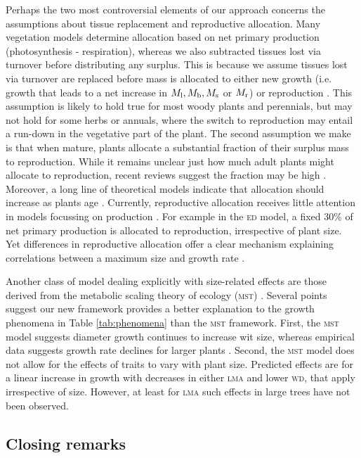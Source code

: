 \documentclass[9pt,twocolumn,twoside,lineno]{pnas-new}
\newcommand{\lma}{\textsc{lma}}
\newcommand{\wood}{\textsc{wd}}
\begin{document}
Perhaps the two most controversial elements of our approach concerns the assumptions about tissue replacement and reproductive allocation. Many vegetation models determine allocation based on net primary production (photosynthesis - respiration), whereas we also subtracted tissues lost via turnover before distributing any surplus. This is because we assume tissues lost via turnover are replaced before mass is allocated to either new growth (i.e. growth that leads to a net increase in $M_{\rm l}, M_{\rm b}, M_{\rm s}$ or $M_{\rm r}$) or reproduction \citep{Thornley-2000}. This assumption is likely to hold true for most woody plants and perennials, but may not hold for some herbs or annuals, where the switch to reproduction may entail a run-down in the vegetative part of the plant. The second assumption we make is that when mature, plants allocate a substantial fraction of their surplus mass to reproduction. While it remains unclear just how much adult plants might allocate to reproduction, recent reviews suggest the fraction may be high \citep{Thomas-2011, Wenk-2015}. Moreover, a long line of theoretical models indicate that allocation should increase as plants age \citep[reviewed by][]{Wenk-2015}. Currently, reproductive allocation receives little attention in models focussing on production \citep[e.g.][]{Sitch-2008, DeKauwe-2014}. For example in the \textsc{ed} model, a fixed 30\% of net primary production is allocated to reproduction, irrespective of plant size. Yet differences in reproductive allocation offer a clear mechanism explaining correlations between a maximum size and growth rate \citep[e.g.][]{Wright-2010}.

Another class of model dealing explicitly with size-related effects are those derived from the metabolic scaling theory  of ecology (\textsc{mst}) \citep{Enquist-1999, Enquist-2007}. Several points suggest our new framework provides a better explanation to the growth phenomena in Table \ref{tab:phenomena} than the \textsc{mst} framework. First, the \textsc{mst} model suggests diameter growth continues to increase wit size, whereas empirical data suggests growth rate declines for larger plants \citep{Canham-2004, Canham-2006, Herault-2011}. Second, the \textsc{mst} model does not allow for the effects of traits to vary with plant size. Predicted effects are for a linear increase in growth with decreases in either {\lma} and lower {\wood}, that apply irrespective of size. However, at least for {\lma} such effects in large trees have not been observed.

\subsection*{Closing remarks}
\end{document}
